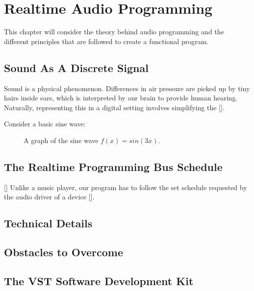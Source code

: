 \chapter{Realtime Audio Programming}
\hspace*{-0.155cm}This chapter will consider the theory behind audio programming and the different principles that are followed to create a functional program.
\section{Sound As A Discrete Signal}
Sound is a physical phenomenon. Differences in air pressure are picked up by tiny hairs inside ears, which is interpreted by our brain to provide human hearing. Naturally, representing this in a digital setting involves simplifying the [].

Consider a basic sine wave:

\begin{figure}[h] %
\begin{center}
	\caption{A graph of the sine wave \(f(x) = sin(3x)\).}
\end{center}
\end{figure}

\section{The Realtime Programming Bus Schedule}
[] Unlike a music player, our program has to follow the set schedule requested by the audio driver of a device [].
\section{Technical Details}
\section{Obstacles to Overcome}
\section{The VST Software Development Kit}
